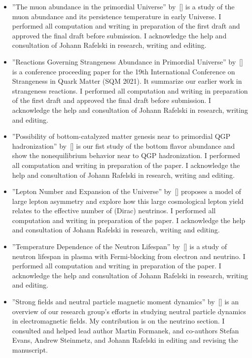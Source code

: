 \begin{itemize}
\item ''The muon abundance in the primordial Universe'' by~[\cite{Rafelski:2021aey}] is a study of the muon abundance and its persistence temperature in early Universe. I performed all 
computation and writing in preparation of the first draft and approved the final draft before 
submission. I acknowledge the help and consultation of Johann Rafelski in research, writing and editing.

\item ''Reactions Governing Strangeness Abundance in Primordial Universe'' by~[\cite{Rafelski:2020ajx}] is a conference proceeding paper for
the 19th International Conference on Strangeness in Quark Matter (SQM 2021). It summarize our earlier work in strangeness reactions. I performed all 
computation and writing in preparation of the first draft and approved the final draft before 
submission. I acknowledge the help and consultation of Johann Rafelski in research, writing and editing.

\item''Possibility of bottom-catalyzed matter genesis near to primordial QGP hadronization'' by~[\cite{Yang:2020nne}] is our fist study of the bottom flavor abundance and show the  nonequilibrium behavior near to QGP hadronization. I performed all computation and writing in preparation of the paper. I acknowledge the help and consultation of Johann Rafelski in research, writing and editing.

\item ''Lepton Number and Expansion of the Universe'' by~[\cite{Yang:2018oqg}] proposes a model of large lepton asymmetry and explore how this large cosmological lepton yield
relates to the effective number of (Dirac) neutrinos. I performed all computation and writing in preparation of the paper. I acknowledge the help and consultation of Johann Rafelski in research, writing and editing.

\item''Temperature Dependence of the Neutron Lifespan'' by~[\cite{Yang:2018qrr}] is a study of neutron lifespan in plasma with Fermi-blocking from electron and neutrino. I performed all computation and writing in preparation of the paper. I acknowledge the help and consultation of Johann Rafelski in research, writing and editing.

\item ''Strong fields and neutral particle magnetic moment dynamics'' by~[\cite{Formanek:2017mbv}] is an overview of our research group's efforts in studying neutral particle dynamics in electromagnetic fields. My contribution is on the neutrino section. I consulted and helped lead author Martin Formanek, and co-authors Stefan Evans, Andrew Steinmetz, and Johann Rafelski in 
editing and revising the manuscript.


\end{itemize}
